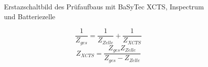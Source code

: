 \begin{figure}[H]
    \centering
    
    \caption{Erstazschaltbild des Prüfaufbaus mit BaSyTec XCTS, Inspectrum und Batteriezelle}\label{fig:schaltbild}
    \label{fig: schaltplan-basy}
\end{figure}

\begin{equation}
    \frac{1}{Z_{ges}} = \frac{1}{Z_{Zelle}} +  \frac{1}{Z_{XCTS}}
\label{eq:imp1}
\end{equation}
\begin{equation}
    Z_{XCTS} = \frac{Z_{ges} Z_{Zelle}}{Z_{ges} - Z_{Zelle}}
\label{eq:imp2}
\end{equation}

